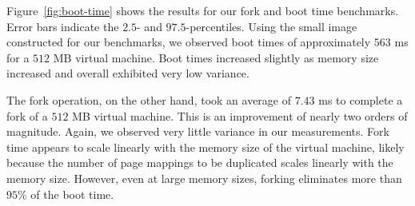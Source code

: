 \begin{figure*}
  \center

  \label{fig:fork-time}
  \hspace{1cm}
  \caption{Time for virtual machine cold start vs. fork}
  \label{fig:boot-time}
\end{figure*}

 Figure~\ref{fig:boot-time} shows the results
for our fork and boot time benchmarks. Error bars indicate the $2.5$- and
$97.5$-percentiles. Using the small image constructed for our benchmarks, we
observed boot times of approximately $563$ ms for a $512$ MB virtual machine.
Boot times increased slightly as memory size increased and overall exhibited
very low variance.

The fork operation, on the other hand, took an average of $7.43$ ms to complete
a fork of a $512$ MB virtual machine. This is an improvement of nearly two
orders of magnitude. Again, we observed very little variance in our
measurements. Fork time appears to scale linearly with the memory size of the
virtual machine, likely because the number of page mappings to be duplicated
scales linearly with the memory size. However, even at large memory sizes,
forking eliminates more than $95$\% of the boot time.

